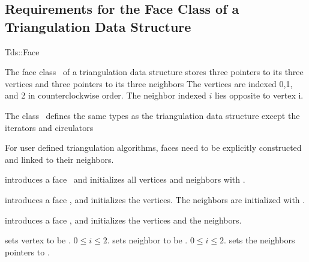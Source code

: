 \subsection{Requirements for the Face  Class of a Triangulation Data Structure}
\label{I1_Sect_Tds_Face}
\begin{ccClass}{Tds::Face}

\ccThreeToTwo

The face class \ccClassName\ of a triangulation data structure
stores three pointers to its three vertices
and three pointers to its three neighbors
The vertices are indexed 0,1, and 2 in counterclockwise order.
The  neighbor indexed $i$ lies
opposite to vertex i. 

\ccInheritsFrom {}

\ccTypes
The class \ccClassName\ defines the same types as 
the triangulation data structure 
except the iterators and circulators


\begin{ccAdvanced}

For user defined triangulation algorithms, faces need to
be explicitly constructed and linked to their neighbors.

{introduces a face \ccVar\ and initializes all vertices and neighbors 
 with .}

{introduces a face \ccVar, and initializes the vertices. The 
neighbors are initialized with .}

{introduces a face \ccVar, and initializes the vertices and the neighbors.}

\end{ccAdvanced} 


\begin{ccAdvanced}
{sets vertex  to be .
\ccPrecond $0\leq i \leq 2$.
}
\ccGlue
{}
{sets neighbor  to be .
\ccPrecond $0\leq i \leq 2$.
}
\ccGlue
{}
\ccGlue
{}
\ccGlue
{} {sets the neighbors pointers to .}
\ccGlue
{}


\end{ccAdvanced}
\end{ccClass}
